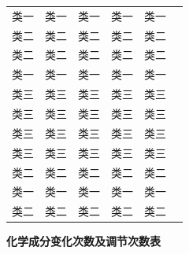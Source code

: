 \documentclass[withoutpreface,bwprint]{cumcmthesis} %
\begin{document}
\begin{appendices}
\begin{table}[H]
\begin{tabular}{llllll}
    类一    & 类一     & 类一    & 类一     & 类一     &        \\
    类二    & 类二     & 类二    & 类二     & 类二     &        \\
    类二    & 类二     & 类二    & 类二     & 类二     &        \\
    类一    & 类一     & 类一    & 类一     & 类一     &        \\
    类三    & 类三     & 类三    & 类三     & 类三     &        \\
    类三    & 类三     & 类三    & 类三     & 类三     &        \\
    类三    & 类三     & 类三    & 类三     & 类三     &        \\
    类三    & 类三     & 类三    & 类三     & 类三     &        \\
    类二    & 类二     & 类二    & 类二     & 类二     &        \\
    类一    & 类一     & 类一    & 类一     & 类一     &        \\
    类二    & 类二     & 类二    & 类二     & 类二     &              \\ \bottomrule[1.5pt]
  \end{tabular}
\end{table}


\newpage
\textbf{化学成分变化次数及调节次数表}


\end{appendices}
\end{document}
